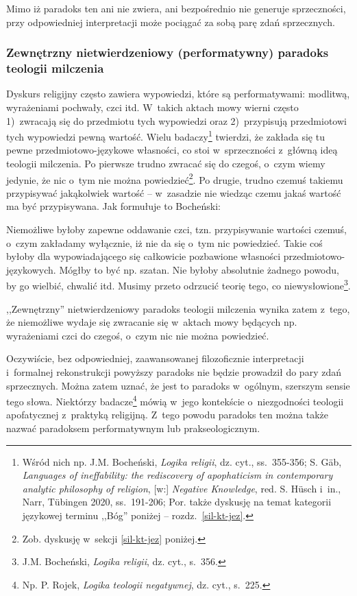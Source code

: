 Mimo iż paradoks ten ani nie zwiera, ani bezpośrednio nie generuje sprzeczności, przy odpowiedniej interpretacji może pociągać za sobą parę zdań sprzecznych.


\subsubsection{Zewnętrzny nietwierdzeniowy (performatywny) paradoks teologii milczenia}

Dyskurs religijny często zawiera wypowiedzi, które są performatywami: modlitwą, wyrażeniami pochwały, czci itd. W~takich aktach mowy wierni często 1)~zwracają się do przedmiotu tych wypowiedzi oraz 2)~przypisują przedmiotowi tych wypowiedzi pewną wartość. Wielu badaczy\footnote{Wśród nich np. J.M. Bocheński, \textit{Logika religii}, dz. cyt., ss.~355-356; S. Gäb, \textit{Languages of ineffability: the rediscovery of apophaticism in contemporary analytic philosophy of religion}, [w:] \textit{Negative Knowledge}, red. S. Hüsch i~in., Narr, Tübingen 2020, ss.~191-206; Por. także dyskusję na temat kategorii językowej terminu ,,Bóg'' poniżej -- rozdz.~\ref{sil-kt-jez}.} twierdzi, że zakłada się tu pewne przedmiotowo-językowe własności, co stoi w~sprzeczności z~główną ideą teologii milczenia. Po pierwsze trudno zwracać się do czegoś, o~czym wiemy jedynie, że nic o~tym nie można powiedzieć\footnote{Zob. dyskusję w~sekcji \ref{sil-kt-jez} poniżej.}. Po drugie, trudno czemuś takiemu przypisywać jakąkolwiek wartość -- w~zasadzie nie wiedząc czemu jakaś wartość ma być przypisywana. Jak formułuje to Bocheński:

Niemożliwe byłoby zapewne oddawanie czci, tzn. przypisywanie wartości czemuś, o~czym zakładamy wyłącznie, iż nie da się o~tym nic powiedzieć. Takie coś byłoby dla wypowiadającego się całkowicie pozbawione własności przedmiotowo-językowych. Mógłby to być np. szatan. Nie byłoby absolutnie żadnego powodu, by go wielbić, chwalić itd. Musimy przeto odrzucić teorię tego, co niewysłowione\footnote{J.M. Bocheński, \textit{Logika religii}, dz. cyt., s.~356.}.

,,Zewnętrzny'' nietwierdzeniowy paradoks teologii milczenia wynika zatem z~tego, że niemożliwe wydaje się zwracanie się w~aktach mowy będących np. wyrażeniami czci do czegoś, o~czym nic nie można powiedzieć.

Oczywiście, bez odpowiedniej, zaawansowanej filozoficznie interpretacji i~formalnej rekonstrukcji powyższy paradoks nie będzie prowadził do pary zdań sprzecznych. Można zatem uznać, że jest to paradoks w~ogólnym, szerszym sensie tego słowa. Niektórzy badacze\footnote{Np. P. Rojek, \textit{Logika teologii negatywnej}, dz. cyt., s.~225.} mówią w~jego kontekście o~niezgodności teologii apofatycznej z~praktyką religijną. Z~tego powodu paradoks ten można także nazwać paradoksem performatywnym lub prakseologicznym.

